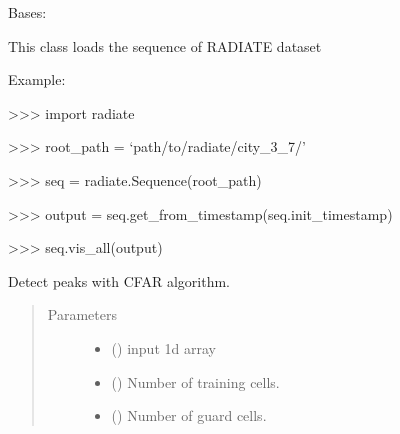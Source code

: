 \documentclass[letterpaper,10pt,english]{sphinxmanual}
\begin{document}
\begin{fulllineitems}
\label{\detokenize{radiate:radiate.Sequence}}
Bases: 

This class loads the sequence of RADIATE dataset

\begin{DUlineblock}{0em}
\item[] Example:
\item[] \textgreater{}\textgreater{}\textgreater{} import radiate
\item[] \textgreater{}\textgreater{}\textgreater{} root\_path = ‘path/to/radiate/city\_3\_7/’
\item[] \textgreater{}\textgreater{}\textgreater{} seq = radiate.Sequence(root\_path)
\item[] \textgreater{}\textgreater{}\textgreater{} output = seq.get\_from\_timestamp(seq.init\_timestamp)
\item[] \textgreater{}\textgreater{}\textgreater{} seq.vis\_all(output)
\end{DUlineblock}

\begin{fulllineitems}
\label{\detokenize{radiate:radiate.Sequence.cfar}}
Detect peaks with CFAR algorithm.
\begin{quote}\begin{description}
\item[{Parameters}] \leavevmode\begin{itemize}
\item {} 
 () \textendash{} input 1d array

\item {} 
 () \textendash{} Number of training cells.

\item {} 
 () \textendash{} Number of guard cells.


\end{itemize}
\end{description}
\end{quote}
\end{fulllineitems}
\end{fulllineitems}
\end{document}
